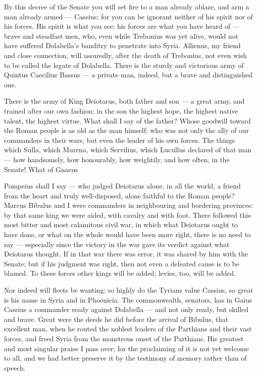  By this decree of the Senate you will set fire to a man already ablaze, and arm a man already armed --- Cassius; for you can be ignorant neither of his spirit nor of his forces. His spirit is what you see; his forces are what you have heard of --- brave and steadfast men, who, even while Trebonius was yet alive, would not have suffered Dolabella's banditry to penetrate into Syria. Allienus, my friend and close connection, will assuredly, after the death of Trebonius, not even wish to be called the legate of Dolabella. There is the sturdy and victorious army of Quintus Caecilius Bassus --- a private man, indeed, but a brave and distinguished one.

 There is the army of King Deiotarus, both father and son --- a great army, and trained after our own fashion; in the son the highest hope, the highest native talent, the highest virtue. What shall I say of the father? Whose goodwill toward the Roman people is as old as the man himself; who was not only the ally of our commanders in their wars, but even the leader of his own forces. The things which Sulla, which Murena, which Servilius, which Lucullus declared of that man --- how handsomely, how honourably, how weightily, and how often, in the Senate! What of Gnaeus

 Pompeius shall I say --- who judged Deiotarus alone, in all the world, a friend from the heart and truly well-disposed, alone faithful to the Roman people? Marcus Bibulus and I were commanders in neighbouring and bordering provinces: by that same king we were aided, with cavalry and with foot. There followed this most bitter and most calamitous civil war, in which what Deiotarus ought to have done, or what on the whole would have been more right, there is no need to say --- especially since the victory in the war gave its verdict against what Deiotarus thought. If in that war there was error, it was shared by him with the Senate; but if his judgment was right, then not even a defeated cause is to be blamed. To these forces other kings will be added; levies, too, will be added.

 Nor indeed will fleets be wanting: so highly do the Tyrians value Cassius, so great is his name in Syria and in Phoenicia. The commonwealth, senators, has in Gaius Cassius a commander ready against Dolabella --- and not only ready, but skilled and brave. Great were the deeds he did before the arrival of Bibulus, that excellent man, when he routed the noblest leaders of the Parthians and their vast forces, and freed Syria from the monstrous onset of the Parthians. His greatest and most singular praise I pass over; for the proclaiming of it is not yet welcome to all, and we had better preserve it by the testimony of memory rather than of speech.

